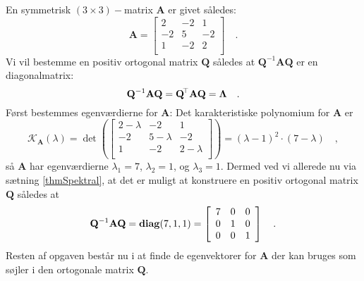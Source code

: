 \begin{example} \label{exampLAbog8.16}
En symmetrisk $(3 \times 3)-$matrix $\mathbf{A}$ er givet således:
\begin{equation}
\mathbf{A} = \left[
               \begin{array}{rrr}
                 2 & -2 & 1 \\
                 -2 & 5 & -2 \\
                 1 & -2 & 2 \\
               \end{array}
             \right] \quad .
\end{equation}
Vi vil bestemme en positiv ortogonal matrix $\mathbf{Q}$ således at $\mathbf{Q}^{-1}\mathbf{A}\mathbf{Q}$ er en diagonalmatrix:
\begin{equation}
\mathbf{Q}^{-1}\mathbf{A}\mathbf{Q} = \mathbf{Q}\hspace*{-.6mm}^{\top}\mathbf{A}\mathbf{Q} =  \bm{\Lambda} \quad .
\end{equation}
Først bestemmes egenværdierne for $\mathbf{A}$: Det karakteristiske polynomium for $\mathbf{A}$ er
\begin{equation}
\mathcal{K}_{\mathbf{A}}(\lambda) = \det\left(\left[
               \begin{array}{ccc}
                 2-\lambda & -2 & 1 \\
                 -2 & 5-\lambda  & -2 \\
                 1 & -2 & 2-\lambda  \\
               \end{array}
             \right] \right)  = (\lambda-1)^{2}\cdot(7-\lambda) \quad ,
\end{equation}
så $\mathbf{A}$ har egenværdierne $\lambda_{1} = 7$, $\lambda_{2} = 1$, og $\lambda_{3} = 1$.
Dermed ved vi allerede nu via sætning \ref{thmSpektral}, at det er muligt at konstruere en positiv ortogonal matrix $\mathbf{Q}$ således at
\begin{equation}
\mathbf{Q}^{-1}\mathbf{A}\mathbf{Q} = \operatorname{\bf{diag}}(7,1,1) = \left[
                                           \begin{array}{rrr}
                                             7 & 0 & 0 \\
                                             0 & 1 & 0 \\
                                             0 & 0 & 1 \\
                                           \end{array}
                                         \right] \quad .
\end{equation}
Resten af opgaven består nu i at finde de egenvektorer for $\mathbf{A}$ der kan bruges som søjler i den ortogonale matrix $\mathbf{Q}$. \\


\end{example}
